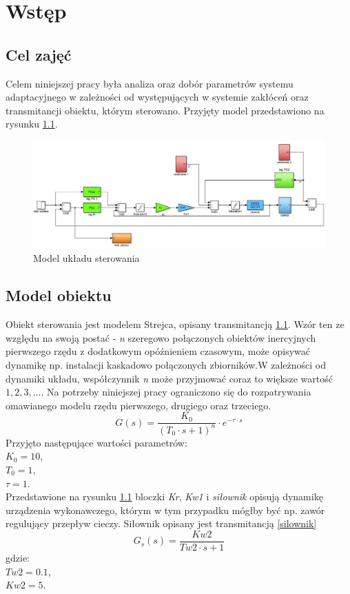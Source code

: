 \chapter{Wstęp}

\section{Cel zajęć}
Celem niniejszej pracy była analiza oraz dobór parametrów systemu adaptacyjnego w zależności od występujących w systemie zakłóceń oraz transmitancji obiektu, którym sterowano. Przyjęty model przedstawiono na rysunku \ref{model_systemu}.

\begin{figure}[h!]
	\centering
	\includegraphics[scale = 0.5]{fig/model_systemu.jpg}
	\caption		
	{Model układu sterowania}
	\label{model_systemu}
\end{figure} 

\section{Model obiektu}
Obiekt sterowania jest modelem Strejca, opisany transmitancją \ref{model_systemu}. Wzór ten ze względu na swoją postać - \textit{n} szeregowo połączonych obiektów inercyjnych pierwszego rzędu z dodatkowym opó\'znieniem czasowym, może opisywać dynamikę np. instalacji kaskadowo połączonych zbiorników.W zależności od dynamiki układu, współczynnik \textit{n} może przyjmować coraz to większe wartość $1, 2, 3, ...$. Na potrzeby niniejszej pracy ograniczono się do rozpatrywania omawianego modelu rzędu pierwszego, drugiego oraz trzeciego. 
\begin{equation}\label{main_trans}
G(s) = \dfrac{K_0}{(T_0 \cdot s + 1)^n} \cdot e^{-\tau \cdot s} 
\end{equation}
Przyjęto następujące wartości parametrów: \\
$K_0 = 10$,\\
$T_0 = 1$,\\
$\tau = 1$.\\
 Przedstawione na rysunku \ref{model_systemu} bloczki \textit{Kr}, \textit{Kw1} i \textit{siłownik} opisują dynamikę urządzenia wykonawczego, którym w tym przypadku mógłby być np. zawór regulujący przepływ cieczy. Siłownik opisany jest transmitancją \ref{silownik}
\begin{equation}\label{silownik}
G_s(s) = \dfrac{Kw2}{Tw2 \cdot s + 1}
\end{equation}
gdzie: \\
$Tw2 = 0.1$, \\
$Kw2 = 5$. \\
%


